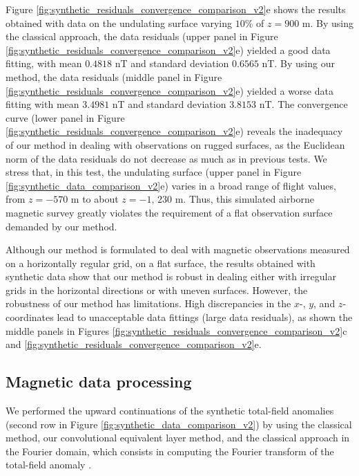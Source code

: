 \documentclass[manuscript]{geophysics}
\begin{document}
Figure \ref{fig:synthetic_residuals_convergence_comparison_v2}e shows the results obtained
with data on the undulating surface varying $10\%$ of $z = 900$ m.
By using the classical approach, the data residuals (upper panel in 
Figure \ref{fig:synthetic_residuals_convergence_comparison_v2}e) 
yielded a good data fitting, with mean $0.4818$ nT and standard deviation $0.6565$ nT. 
By using our method, the data residuals (middle panel in 
Figure \ref{fig:synthetic_residuals_convergence_comparison_v2}e) yielded a worse data fitting 
with mean $3.4981$ nT and standard deviation $3.8153$ nT.
The convergence curve (lower panel in Figure \ref{fig:synthetic_residuals_convergence_comparison_v2}e)
reveals the inadequacy of our method in dealing with observations on rugged surfaces, as 
the Euclidean norm of the data residuals do not decrease as much as in previous tests. 
We stress that, in this test, the undulating surface (upper panel in Figure 
\ref{fig:synthetic_data_comparison_v2}e) varies in a broad range of flight values, from $z = - 570$ m to about 
$z = -1,\, 230$ m. Thus, this simulated airborne magnetic survey greatly violates the requirement 
of a flat observation surface demanded by our method.

Although our method is formulated to deal with magnetic observations measured on 
a horizontally regular grid, on a flat surface, the results obtained with synthetic 
data show that our method is robust in dealing either with irregular grids in the 
horizontal directions or with uneven surfaces.
However, the robustness of our method has limitations.
High discrepancies in the $x$-, $y$, and $z$-coordinates lead to unacceptable 
data fittings (large data residuals), as shown the middle panels in Figures 
\ref{fig:synthetic_residuals_convergence_comparison_v2}c and
\ref{fig:synthetic_residuals_convergence_comparison_v2}e.

\subsection*{Magnetic data processing}

We performed the upward continuations of the synthetic total-field anomalies 
(second row in Figure \ref{fig:synthetic_data_comparison_v2}) by using 
the classical method, our convolutional equivalent layer method, and 
the classical approach in the Fourier domain,
which consists in computing the Fourier transform of the total-field anomaly 
\citep[e.g.,][ p. 317]{blakely1996}. 
\end{document}
